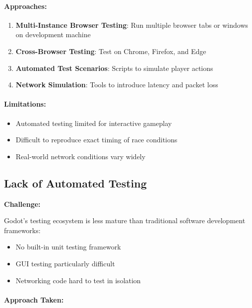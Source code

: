 \paragraph*{Approaches:}

\begin{enumerate}
    \item \textbf{Multi-Instance Browser Testing}: Run multiple browser tabs or windows on development machine
    \item \textbf{Cross-Browser Testing}: Test on Chrome, Firefox, and Edge
    \item \textbf{Automated Test Scenarios}: Scripts to simulate player actions
    \item \textbf{Network Simulation}: Tools to introduce latency and packet loss
\end{enumerate}

\paragraph*{Limitations:}

\begin{itemize}
    \item Automated testing limited for interactive gameplay
    \item Difficult to reproduce exact timing of race conditions
    \item Real-world network conditions vary widely
\end{itemize}

\subsection{Lack of Automated Testing}
\label{subsec:automated-testing}

\textbf{Challenge:}

Godot's testing ecosystem is less mature than traditional software development frameworks:
\begin{itemize}
    \item No built-in unit testing framework
    \item GUI testing particularly difficult
    \item Networking code hard to test in isolation
\end{itemize}

\paragraph*{Approach Taken:}

